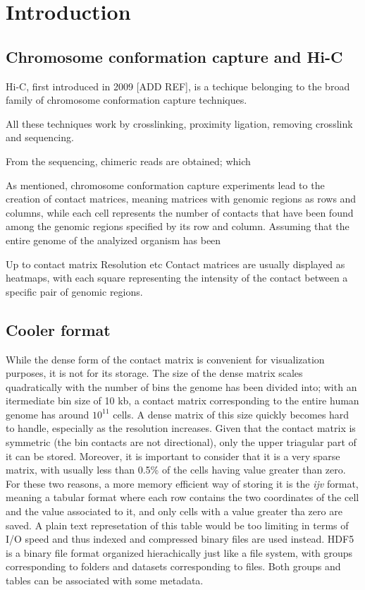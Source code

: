 \graphicspath{{chapters/02_introduction/images}}
\chapter{Introduction}


\section{Chromosome conformation capture and Hi-C}
Hi-C, first introduced in 2009 [ADD REF], is a techique belonging to the broad family of chromosome conformation capture techniques. 

All these techniques work by crosslinking, proximity ligation, removing crosslink and sequencing.

From the sequencing, chimeric reads are obtained; which 

As mentioned, chromosome conformation capture experiments lead to the creation of contact matrices, meaning matrices with genomic regions as rows and columns, while each cell represents the number of contacts that have been found among the genomic regions specified by its row and column. Assuming that the entire genome of the analyized organism has been 

Up to contact matrix
Resolution etc
Contact matrices are usually displayed as heatmaps, with each square representing the intensity of the contact between a specific pair of genomic regions.

\section{Cooler format}
While the dense form of the contact matrix is convenient for visualization purposes, it is not for its storage. The size of the dense matrix scales quadratically with the number of bins the genome has been divided into; with an itermediate bin size of 10 kb, a contact matrix corresponding to the entire human genome has around $10^{11}$ cells. A dense matrix of this size quickly becomes hard to handle, especially as the resolution increases.
Given that the contact matrix is symmetric (the bin contacts are not directional), only the upper triagular part of it can be stored. Moreover, it is important to consider that it is a very sparse matrix, with usually less than 0.5\% of the cells having value greater than zero. %
For these two reasons, a more memory efficient way of storing it is the \emph{ijv} format, meaning a tabular format where each row contains the two coordinates of the cell and the value associated to it, and only cells with a value greater tha zero are saved.
A plain text represetation of this table would be too limiting in terms of I/O speed and thus indexed and compressed binary files are used instead. HDF5 is a binary file format organized hierachically just like a file system, with groups corresponding to folders and datasets corresponding to files. Both groups and tables can be associated with some metadata. %

